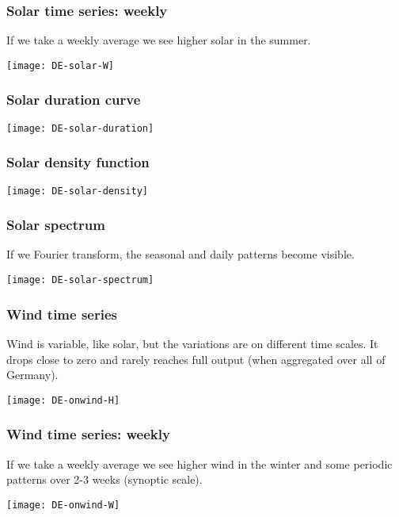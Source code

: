 \documentclass[10pt,aspectratio=169,dvipsnames]{beamer}
\begin{document}
\begin{frame}
  \frametitle{Solar time series: weekly}

  If we take a weekly average we see higher solar in the summer.

  \centering
  \texttt{[image: DE-solar-W]}

\end{frame}



\begin{frame}
  \frametitle{Solar duration curve}



  \centering
  \texttt{[image: DE-solar-duration]}

\end{frame}




\begin{frame}
  \frametitle{Solar density function}

  \centering
  \texttt{[image: DE-solar-density]}

\end{frame}




\begin{frame}
  \frametitle{Solar spectrum}

  If we Fourier transform, the \alert{seasonal} and \alert{daily} patterns become visible.

  \centering
  \texttt{[image: DE-solar-spectrum]}

\end{frame}



\begin{frame}
  \frametitle{Wind time series}

  Wind is variable, like solar, but the variations are on different time scales. It drops close to zero and rarely reaches full output (when aggregated over all of Germany).

  \centering
  \texttt{[image: DE-onwind-H]}

\end{frame}


\begin{frame}
  \frametitle{Wind time series: weekly}

  If we take a weekly average we see higher wind in the winter and
  some periodic patterns over 2-3 weeks (\alert{synoptic scale}).

  \centering
  \texttt{[image: DE-onwind-W]}

\end{frame}
\end{document}
